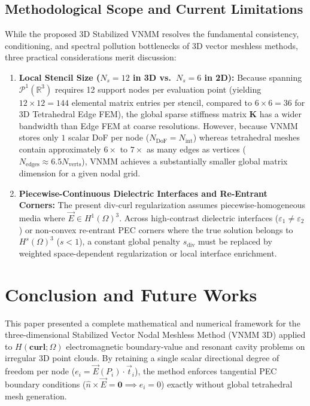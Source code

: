 \documentclass[preprint,12pt]{elsarticle}
\newcommand{\R}{\mathbb{R}}
\newcommand{\Hcurl}{H(\mathbf{curl};\Omega)}
\begin{document}
\subsection{Methodological Scope and Current Limitations}
\label{subsec:sec5_8_limitations}

While the proposed 3D Stabilized VNMM resolves the fundamental consistency, conditioning, and spectral pollution bottlenecks of 3D vector meshless methods, three practical considerations merit discussion:
\begin{enumerate}
    \item \textbf{Local Stencil Size ($N_s = 12$ in 3D vs.\ $N_s = 6$ in 2D):} Because spanning $\mathcal{P}^1(\R^3)$ requires 12 support nodes per evaluation point (yielding $12\times 12 = 144$ elemental matrix entries per stencil, compared to $6\times 6 = 36$ for 3D Tetrahedral Edge FEM), the global sparse stiffness matrix $\mathbf{K}$ has a wider bandwidth than Edge FEM at coarse resolutions. However, because VNMM stores only $1$ scalar DoF per node ($N_{\text{DoF}} = N_{\text{int}}$) whereas tetrahedral meshes contain approximately $6\times$ to $7\times$ as many edges as vertices ($N_{\text{edges}} \approx 6.5 N_{\text{verts}}$), VNMM achieves a substantially smaller global matrix dimension for a given nodal grid.
    \item \textbf{Piecewise-Continuous Dielectric Interfaces and Re-Entrant Corners:} The present div-curl regularization assumes piecewise-homogeneous media where $\vec{E} \in H^1(\Omega)^3$. Across high-contrast dielectric interfaces ($\varepsilon_1 \neq \varepsilon_2$) or non-convex re-entrant PEC corners where the true solution belongs to $H^s(\Omega)^3$ ($s < 1$), a constant global penalty $s_{\text{div}}$ must be replaced by weighted space-dependent regularization \cite{Costabel2000} or local interface enrichment.
\end{enumerate}

\section{Conclusion and Future Works}
\label{sec:conclusion}

This paper presented a complete mathematical and numerical framework for the three-dimensional Stabilized Vector Nodal Meshless Method (VNMM 3D) applied to $\Hcurl$ electromagnetic boundary-value and resonant cavity problems on irregular 3D point clouds. By retaining a single scalar directional degree of freedom per node ($e_i = \vec{E}(P_i)\cdot\vec{t}_i$), the method enforces tangential PEC boundary conditions ($\hat{n}\times\vec{E}=\mathbf{0} \implies e_i=0$) exactly without global tetrahedral mesh generation.
\end{document}
